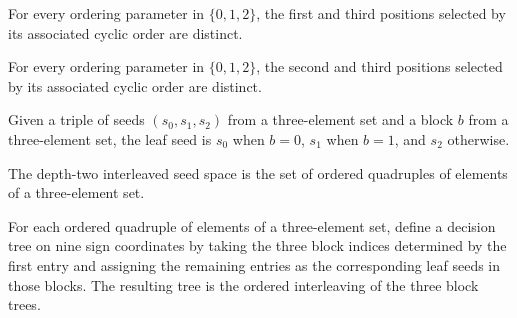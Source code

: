 \begin{theorem}
\label{FABL.depthTwoTopFirst_ne_third}
\leanok
{}
For every ordering parameter in $\{0,1,2\}$, the first and third positions selected by
its associated cyclic order are distinct.
\end{theorem}

\begin{theorem}
\label{FABL.depthTwoTopSecond_ne_third}
\leanok
{}
For every ordering parameter in $\{0,1,2\}$, the second and third positions selected by
its associated cyclic order are distinct.
\end{theorem}

\begin{definition}
\label{FABL.depthTwoLeafSeed}
\leanok
Given a triple of seeds $(s_0,s_1,s_2)$ from a three-element set and a block $b$ from a
three-element set, the leaf seed is $s_0$ when $b=0$, $s_1$ when $b=1$, and $s_2$
otherwise.
\end{definition}

\begin{definition}
\label{FABL.DepthTwoInterleavedSeed}
\leanok
The depth-two interleaved seed space is the set of ordered quadruples of elements of a
three-element set.
\end{definition}

\begin{definition}
\label{FABL.depthTwoInterleavedTreeBySeed}
\leanok
{}
For each ordered quadruple of elements of a three-element set, define a decision tree on
nine sign coordinates by taking the three block indices determined by the first entry
and assigning the remaining entries as the corresponding leaf seeds in those blocks. The
resulting tree is the ordered interleaving of the three block trees.
\end{definition}

